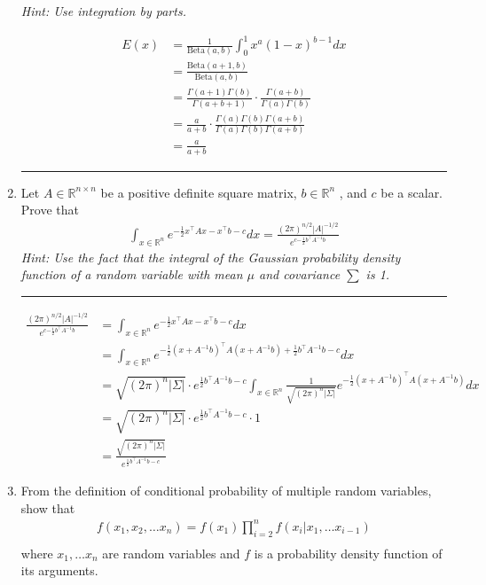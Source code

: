 \documentclass[12pt]{article}
\begin{document}
\begin{enumerate}
    \textit{Hint: Use integration by parts. }

    \begin{align*}
        E(x) &= \frac{1}{\textrm{Beta}(a,b)} \int_0^1 x^a(1-x)^{b-1} dx \\
             &= \frac{\textrm{Beta}(a + 1,b)}{\textrm{Beta}(a,b)} \\
             &= \frac{\Gamma(a + 1)\Gamma(b)}{\Gamma(a+b+1)} \cdot \frac{\Gamma(a+b)}{\Gamma(a)\Gamma(b)} \\
             &= \frac{a}{a+b} \cdot \frac{\Gamma(a)\Gamma(b)\Gamma(a+b)}{\Gamma(a)\Gamma(b)\Gamma(a+b)} \\
             &= \frac{a}{a+b}
    \end{align*}

    \noindent\rule{\linewidth}{1pt}
    \item Let $A \in \mathbb{R}^{n \times n}$ be a positive definite square matrix, $b \in \mathbb{R}^n$ , and $c$ be a scalar. Prove that
    \begin{align*}  
        \int_{x \in \mathbb{R}^n} e^{-\frac{1}{2} x^\intercal Ax-x^\intercal b-c } dx = \frac{(2\pi)^{n/2} |A|^{-1/2} }{e^{c{-\frac{1}{2}b^\intercal A^{-1} b}}}
    \end{align*}
    \textit{Hint: Use the fact that the integral of the Gaussian probability density function of a random variable with mean $\mu$ and covariance $\sum$ is 1.}

    \noindent\rule{\linewidth}{1pt}

    \begin{align*}
        \frac{(2\pi)^{n/2} |A|^{-1/2} }{e^{c{-\frac{1}{2}b^\intercal A^{-1} b}}} &= \int_{x \in \mathbb{R}^n} e^{-\frac{1}{2} x^\intercal Ax-x^\intercal b-c } dx \\
        &= \int_{x \in \mathbb{R}^n} e^{-\frac{1}{2} (x + A^{-1} b)^\intercal A(x+A^{-1} b) + \frac{1}{2} b^\intercal A^{-1} b -c } dx \\
        &= \sqrt{(2\pi)^n |\Sigma|} \cdot e^{\frac{1}{2} b^\intercal A^{-1} b -c} \int_{x \in \mathbb{R}^n} \frac{1}{\sqrt{(2\pi)^n |\Sigma|}} e^{-\frac{1}{2} (x + A^{-1} b)^\intercal A(x+A^{-1} b) } dx \\
        &= \sqrt{(2\pi)^n |\Sigma|} \cdot e^{\frac{1}{2} b^\intercal A^{-1} b -c} \cdot 1 \\
        &= \frac{\sqrt{(2\pi)^n |\Sigma|}}{e^{\frac{1}{2} b^\intercal A^{-1} b -c}}
    \end{align*}
    
    \item From the definition of conditional probability of multiple random variables, show that 
    \begin{align*}
        f(x_1,x_2, \dots x_n) = f(x_1) \prod_{i=2}^{n} f(x_i | x_1, \dots x_{i-1}) \\ 
    \end{align*}
    where $x_1, \dots x_n$ are random variables and $f$ is a probability density function of its arguments. 


\end{enumerate}
\end{document}
